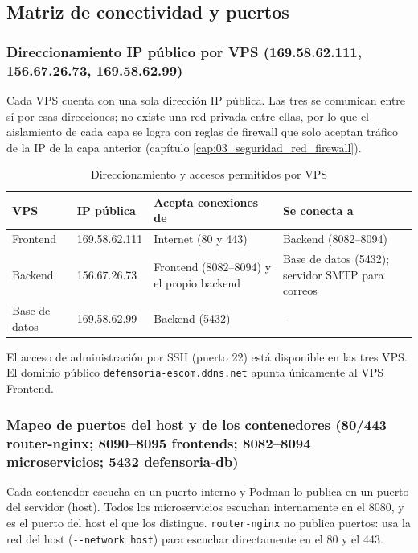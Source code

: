 \subsection{Matriz de conectividad y puertos}\label{sec:1_3_matriz_conectividad}

\subsubsection{Direccionamiento IP público por VPS (169.58.62.111, 156.67.26.73, 169.58.62.99)}
Cada VPS cuenta con una sola dirección IP pública. Las tres se comunican entre sí por esas direcciones; no existe una red privada entre ellas, por lo que el aislamiento de cada capa se logra con reglas de firewall que solo aceptan tráfico de la IP de la capa anterior (capítulo \ref{cap:03_seguridad_red_firewall}).

\begin{table}[H]
\centering
\caption{Direccionamiento y accesos permitidos por VPS}
\small
\begin{tabular}{p{2.3cm}p{2.5cm}p{4.6cm}p{4.6cm}}
\toprule
\textbf{VPS} & \textbf{IP pública} & \textbf{Acepta conexiones de} & \textbf{Se conecta a} \\
\midrule
Frontend & 169.58.62.111 & Internet (80 y 443) & Backend (8082--8094) \\
Backend & 156.67.26.73 & Frontend (8082--8094) y el propio backend & Base de datos (5432); servidor SMTP para correos \\
Base de datos & 169.58.62.99 & Backend (5432) & -- \\
\bottomrule
\end{tabular}
\end{table}

El acceso de administración por SSH (puerto 22) está disponible en las tres VPS. El dominio público \texttt{defensoria-escom.ddns.net} apunta únicamente al VPS Frontend.

\subsubsection{Mapeo de puertos del host y de los contenedores (80/443 router-nginx; 8090--8095 frontends; 8082--8094 microservicios; 5432 defensoria-db)}
Cada contenedor escucha en un puerto interno y Podman lo publica en un puerto del servidor (host). Todos los microservicios escuchan internamente en el 8080, y es el puerto del host el que los distingue. \texttt{router-nginx} no publica puertos: usa la red del host (\texttt{-{}-network host}) para escuchar directamente en el 80 y el 443.


